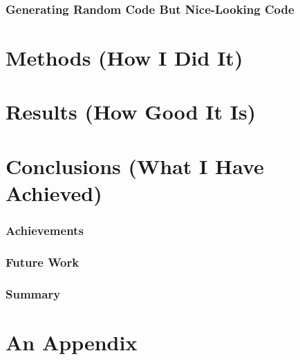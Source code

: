 \documentclass[a4paper,12pt]{mscthesis}
\begin{document}
\subsection{Generating Random Code But Nice-Looking Code}

\chapter{Methods (How I Did It)}

\chapter{Results (How Good It Is)}

\chapter{Conclusions (What I Have Achieved)}

\subsection{Achievements}
\subsection{Future Work}
\subsection{Summary}



\appendix

\chapter{An Appendix}






\end{document}
